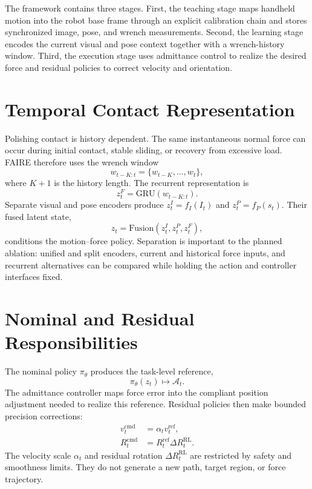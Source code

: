The framework contains three stages. First, the teaching stage maps handheld motion into the robot base frame through an explicit calibration chain and stores synchronized image, pose, and wrench measurements. Second, the learning stage encodes the current visual and pose context together with a wrench-history window. Third, the execution stage uses admittance control to realize the desired force and residual policies to correct velocity and orientation.

\section{Temporal Contact Representation}
Polishing contact is history dependent. The same instantaneous normal force can occur during initial contact, stable sliding, or recovery from excessive load. FAIRE therefore uses the wrench window
\begin{equation}
  w_{t-K:t}=\{w_{t-K},\ldots,w_t\},
  \label{eq:wrench_history}
\end{equation}
where \(K+1\) is the history length. The recurrent representation is
\begin{equation}
  z_t^F=\mathrm{GRU}(w_{t-K:t}).
  \label{eq:force_gru}
\end{equation}
Separate visual and pose encoders produce \(z_t^I=f_I(I_t)\) and \(z_t^P=f_P(s_t)\). Their fused latent state,
\begin{equation}
  z_t=\mathrm{Fusion}(z_t^I,z_t^P,z_t^F),
  \label{eq:fusion}
\end{equation}
conditions the motion--force policy. Separation is important to the planned ablation: unified and split encoders, current and historical force inputs, and recurrent alternatives can be compared while holding the action and controller interfaces fixed.

\section{Nominal and Residual Responsibilities}
The nominal policy \(\pi_\theta\) produces the task-level reference,
\begin{equation}
  \pi_\theta(z_t)\mapsto\mathcal{A}_t.
  \label{eq:motion_force_policy}
\end{equation}
The admittance controller maps force error into the compliant position adjustment needed to realize this reference. Residual policies then make bounded precision corrections:
\begin{align}
  v_t^{\mathrm{cmd}} &= \alpha_t v_t^{\mathrm{ref}},\\
  R_t^{\mathrm{cmd}} &= R_t^{\mathrm{ref}}\Delta R_t^{\mathrm{RL}}.
  \label{eq:residual_commands_overview}
\end{align}
The velocity scale \(\alpha_t\) and residual rotation \(\Delta R_t^{\mathrm{RL}}\) are restricted by safety and smoothness limits. They do not generate a new path, target region, or force trajectory.

